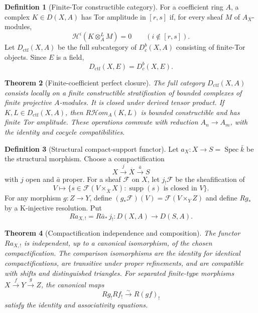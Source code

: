\documentclass[10pt]{article}
\newtheorem{theorem}{Theorem}[section]
\theoremstyle{definition}
\newtheorem{definition}[theorem]{Definition}
\newcommand{\Dbc}{D^b_c}
\newcommand{\Spec}{\operatorname{Spec}}
\begin{document}
\begin{definition}[Finite-Tor constructible category]
For a coefficient ring \(A\), a complex \(K\in D(X,A)\) has Tor amplitude
in \([r,s]\) if, for every sheaf \(M\) of \(A_X\)-modules,
\[
 \mathcal H^i(K\otimes_A^LM)=0\qquad(i\notin[r,s]).
\]
Let \(D_{\mathrm{ctf}}(X,A)\) be the full subcategory of
\(D^b_c(X,A)\) consisting of finite-Tor objects.  Since \(E\) is a field,
\[
                 D_{\mathrm{ctf}}(X,E)=\Dbc(X,E).
\]
\end{definition}

\begin{theorem}[Finite-coefficient perfect closure]
The full category \(D_{\mathrm{ctf}}(X,A)\) consists locally on a finite
constructible stratification of bounded complexes of finite projective
\(A\)-modules.  It is closed under derived tensor product.  If
\(K,L\in D_{\mathrm{ctf}}(X,A)\), then
\(R\mathcal Hom_A(K,L)\) is bounded constructible and has finite Tor
amplitude.  These operations commute with reduction \(A_n\to A_m\), with
the identity and cocycle compatibilities.
\end{theorem}

\begin{definition}[Structural compact-support functor]
Let \(a_X:X\to S=\Spec\bar k\) be the structural morphism.  Choose a
compactification
\[
 X\xrightarrow{j}\overline X\xrightarrow{\bar a}S
\]
with \(j\) open and \(\bar a\) proper.  For a sheaf \(\mathcal F\) on
\(X\), let \(j_!\mathcal F\) be the sheafification of
\[
 V\longmapsto
 \{s\in\mathcal F(V\times_{\overline X}X):
       \operatorname{supp}(s)\text{ is closed in }V\}.
\]
For any morphism \(g:Z\to Y\), define
\((g_*\mathcal F)(V)=\mathcal F(V\times_YZ)\) and define \(Rg_*\) by a
K-injective resolution.  Put
\[
                  Ra_{X,!}=R\bar a_*\,j_!:D(X,A)\to D(S,A).
\]
\end{definition}

\begin{theorem}[Compactification independence and composition]
The functor \(Ra_{X,!}\) is independent, up to a canonical isomorphism, of
the chosen compactification.  The comparison isomorphisms are the identity
for identical compactifications, are transitive under proper refinements,
and are compatible with shifts and distinguished triangles.  For separated finite-type
morphisms \(X\xrightarrow fY\xrightarrow gZ\), the canonical maps
\[
                 Rg_!Rf_!\xrightarrow{\sim}R(gf)_!
\]
satisfy the identity and associativity equations.
\end{theorem}
\end{document}
